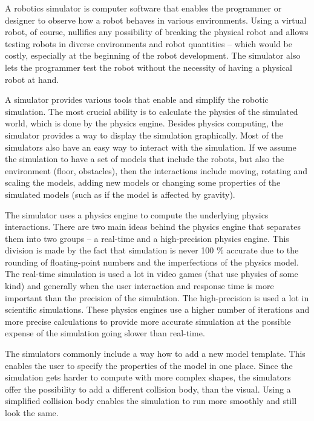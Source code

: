 \documentclass[
  printed, %
  color,   %
  notable, %
  oneside, %
  nolof,   %
  nolot,   %
  nocover,
]{fithesis3}
\begin{document}
A robotics simulator is computer software that enables the programmer or designer to observe how a robot behaves in various environments.
Using a virtual robot, of course, nullifies any possibility of breaking the physical robot and allows testing robots in diverse environments and robot quantities -- which would be costly, especially at the beginning of the robot development.
The simulator also lets the programmer test the robot without the necessity of having a physical robot at hand.

A simulator provides various tools that enable and simplify the robotic simulation.
The most crucial ability is to calculate the physics of the simulated world, which is done by the physics engine.
Besides physics computing, the simulator provides a way to display the simulation graphically.
Most of the simulators also have an easy way to interact with the simulation.
If we assume the simulation to have a set of models that include the robots, but also the environment (floor, obstacles), then the interactions include moving, rotating and scaling the models, adding new models or changing some properties of the simulated models (such as if the model is affected by gravity).

The simulator uses a physics engine to compute the underlying physics interactions.
There are two main ideas behind the physics engine that separates them into two groups -- a real-time and a high-precision physics engine.
This division is made by the fact that simulation is never 100 \% accurate due to the rounding of floating-point numbers and the imperfections of the physics model.
The real-time simulation is used a lot in video games (that use physics of some kind) and generally when the user interaction and response time is more important than the precision of the simulation.
The high-precision is used a lot in scientific simulations.
These physics engines use a higher number of iterations and more precise calculations to provide more accurate simulation at the possible expense of the simulation going slower than real-time.

The simulators commonly include a way how to add a new model template.
This enables the user to specify the properties of the model in one place.
Since the simulation gets harder to compute with more complex shapes, the simulators offer the possibility to add a different collision body, than the visual.
Using a simplified collision body enables the simulation to run more smoothly and still look the same.
\end{document}
